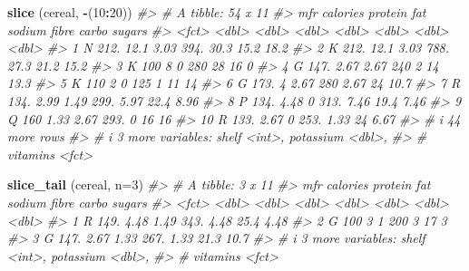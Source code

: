 \documentclass[
]{book}
\newenvironment{Shaded}{\begin{snugshade}}{\end{snugshade}}
\newcommand{\AttributeTok}[1]{\textcolor[rgb]{0.13,0.29,0.53}{#1}}
\newcommand{\CommentTok}[1]{\textcolor[rgb]{0.56,0.35,0.01}{\textit{#1}}}
\newcommand{\DecValTok}[1]{\textcolor[rgb]{0.00,0.00,0.81}{#1}}
\newcommand{\FunctionTok}[1]{\textcolor[rgb]{0.13,0.29,0.53}{\textbf{#1}}}
\newcommand{\NormalTok}[1]{#1}
\newcommand{\SpecialCharTok}[1]{\textcolor[rgb]{0.81,0.36,0.00}{\textbf{#1}}}
\begin{document}
\begin{Shaded}
\begin{Highlighting}[]
\FunctionTok{slice}\NormalTok{ (cereal, }\SpecialCharTok{{-}}\NormalTok{(}\DecValTok{10}\SpecialCharTok{:}\DecValTok{20}\NormalTok{))}
\CommentTok{\#\textgreater{} \# A tibble: 54 x 11}
\CommentTok{\#\textgreater{}    mfr   calories protein   fat sodium fibre carbo sugars}
\CommentTok{\#\textgreater{}    \textless{}fct\textgreater{}    \textless{}dbl\textgreater{}   \textless{}dbl\textgreater{} \textless{}dbl\textgreater{}  \textless{}dbl\textgreater{} \textless{}dbl\textgreater{} \textless{}dbl\textgreater{}  \textless{}dbl\textgreater{}}
\CommentTok{\#\textgreater{}  1 N         212.   12.1   3.03   394. 30.3   15.2  18.2 }
\CommentTok{\#\textgreater{}  2 K         212.   12.1   3.03   788. 27.3   21.2  15.2 }
\CommentTok{\#\textgreater{}  3 K         100     8     0      280  28     16     0   }
\CommentTok{\#\textgreater{}  4 G         147.    2.67  2.67   240   2     14    13.3 }
\CommentTok{\#\textgreater{}  5 K         110     2     0      125   1     11    14   }
\CommentTok{\#\textgreater{}  6 G         173.    4     2.67   280   2.67  24    10.7 }
\CommentTok{\#\textgreater{}  7 R         134.    2.99  1.49   299.  5.97  22.4   8.96}
\CommentTok{\#\textgreater{}  8 P         134.    4.48  0      313.  7.46  19.4   7.46}
\CommentTok{\#\textgreater{}  9 Q         160     1.33  2.67   293.  0     16    16   }
\CommentTok{\#\textgreater{} 10 R         133.    2.67  0      253.  1.33  24     6.67}
\CommentTok{\#\textgreater{} \# i 44 more rows}
\CommentTok{\#\textgreater{} \# i 3 more variables: shelf \textless{}int\textgreater{}, potassium \textless{}dbl\textgreater{},}
\CommentTok{\#\textgreater{} \#   vitamins \textless{}fct\textgreater{}}

\FunctionTok{slice\_tail}\NormalTok{ (cereal, }\AttributeTok{n=}\DecValTok{3}\NormalTok{)}
\CommentTok{\#\textgreater{} \# A tibble: 3 x 11}
\CommentTok{\#\textgreater{}   mfr   calories protein   fat sodium fibre carbo sugars}
\CommentTok{\#\textgreater{}   \textless{}fct\textgreater{}    \textless{}dbl\textgreater{}   \textless{}dbl\textgreater{} \textless{}dbl\textgreater{}  \textless{}dbl\textgreater{} \textless{}dbl\textgreater{} \textless{}dbl\textgreater{}  \textless{}dbl\textgreater{}}
\CommentTok{\#\textgreater{} 1 R         149.    4.48  1.49   343.  4.48  25.4   4.48}
\CommentTok{\#\textgreater{} 2 G         100     3     1      200   3     17     3   }
\CommentTok{\#\textgreater{} 3 G         147.    2.67  1.33   267.  1.33  21.3  10.7 }
\CommentTok{\#\textgreater{} \# i 3 more variables: shelf \textless{}int\textgreater{}, potassium \textless{}dbl\textgreater{},}
\CommentTok{\#\textgreater{} \#   vitamins \textless{}fct\textgreater{}}


\end{Highlighting}
\end{Shaded}
\end{document}
